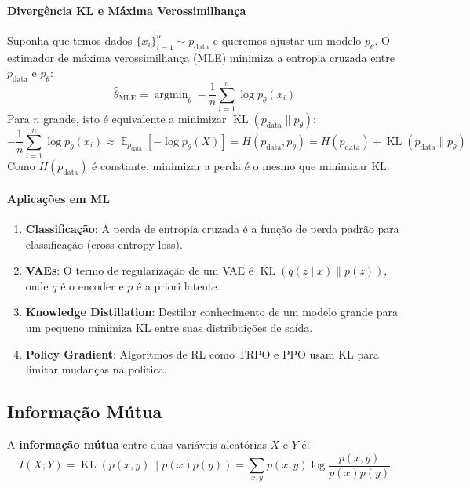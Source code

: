 \documentclass{tufte-handout}
\DeclareMathOperator*{\argmin}{argmin}
\DeclareMathOperator{\E}{\mathbb{E}}
\DeclareMathOperator{\KL}{KL}
\begin{document}
\paragraph{Divergência KL e Máxima Verossimilhança}

Suponha que temos dados $\{x_i\}_{i=1}^n \sim p_{\text{data}}$ e queremos ajustar um
modelo $p_\theta$. O estimador de máxima verossimilhança (MLE) minimiza a entropia
cruzada entre $p_{\text{data}}$ e $p_\theta$:
\[
\hat{\theta}_{\text{MLE}} = \argmin_\theta -\frac{1}{n}\sum_{i=1}^n \log p_\theta(x_i)
\]
Para $n$ grande, isto é equivalente a minimizar $\KL(p_{\text{data}} \parallel p_\theta)$:
\[
-\frac{1}{n}\sum_{i=1}^n \log p_\theta(x_i) \approx \E_{p_{\text{data}}}[-\log p_\theta(X)] = H(p_{\text{data}}, p_\theta) = H(p_{\text{data}}) + \KL(p_{\text{data}} \parallel p_\theta)
\]
Como $H(p_{\text{data}})$ é constante, minimizar a perda é o mesmo que minimizar KL.

\paragraph{Aplicações em ML}
\begin{enumerate}
    \item \textbf{Classificação}: A perda de entropia cruzada é a função de perda padrão
    para classificação (cross-entropy loss).
    \item \textbf{VAEs}: O termo de regularização de um VAE é $\KL(q(z\mid x) \parallel p(z))$,
    onde $q$ é o encoder e $p$ é a priori latente.
    \item \textbf{Knowledge Distillation}: Destilar conhecimento de um modelo grande
    para um pequeno minimiza KL entre suas distribuições de saída.
    \item \textbf{Policy Gradient}: Algoritmos de RL como TRPO e PPO usam KL para
    limitar mudanças na política.
\end{enumerate}

\subsection{Informação Mútua}

\begin{defn}
    A \textbf{informação mútua} entre duas variáveis aleatórias $X$ e $Y$ é:
    \[
    I(X; Y) = \KL(p(x,y) \parallel p(x)p(y)) = \sum_{x,y} p(x,y) \log \frac{p(x,y)}{p(x)p(y)}
    \]
\end{defn}
\end{document}
